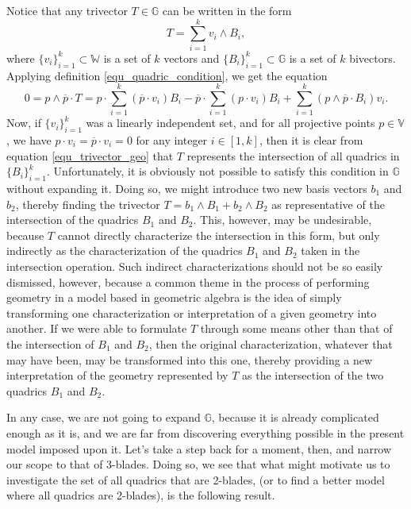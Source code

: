 \documentclass{birkjour}
\theoremstyle{definition}
\theoremstyle{remark}
\numberwithin{equation}{section}
\newcommand{\G}{\mathbb{G}}
\newcommand{\V}{\mathbb{V}}
\newcommand{\W}{\mathbb{W}}
\begin{document}
Notice that any trivector $T\in\G$ can be written in the form
\begin{equation}
T = \sum_{i=1}^k v_i\wedge B_i,
\end{equation}
where $\{v_i\}_{i=1}^k\subset\W$ is a set of $k$ vectors and $\{B_i\}_{i=1}^k\subset\G$
is a set of $k$ bivectors.  Applying definition \eqref{equ_quadric_condition}, we get the equation
\begin{equation}\label{equ_trivector_geo}
0 = p\wedge\overline{p}\cdot T =
p\cdot\sum_{i=1}^k(\overline{p}\cdot v_i)B_i -
\overline{p}\cdot\sum_{i=1}^k(p\cdot v_i)B_i +
\sum_{i=1}^k(p\wedge\overline{p}\cdot B_i)v_i.
\end{equation}
Now, if $\{v_i\}_{i=1}^k$ was a linearly independent set, and for all projective points $p\in\V$, we have $p\cdot v_i=\overline{p}\cdot v_i=0$
for any integer $i\in[1,k]$, then it is clear
from equation \eqref{equ_trivector_geo} that $T$ represents the intersection of all quadrics in $\{B_i\}_{i=1}^k$.
Unfortunately, it is obviously not possible to satisfy this condition in $\G$ without expanding it.
Doing so, we might introduce two new basis vectors $b_1$ and $b_2$, thereby finding the trivector
$T=b_1\wedge B_1+b_2\wedge B_2$ as representative of the intersection of the quadrics $B_1$ and $B_2$.
This, however, may be undesirable, because $T$ cannot directly characterize the intersection in this form, but
only indirectly as the characterization of the quadrics $B_1$ and $B_2$ taken in the intersection operation.
Such indirect characterizations should not be so easily dismissed, however, because a common theme
in the process of performing geometry in a model based in geometric algebra is the idea of simply transforming
one characterization or interpretation of a given geometry into another.  If we were able to formulate $T$ through some means
other than that of the intersection of $B_1$ and $B_2$, then the original characterization, whatever that may
have been, may be transformed into
this one, thereby providing a new interpretation of the geometry represented by $T$ as the intersection
of the two quadrics $B_1$ and $B_2$.

In any case, we are not going to expand $\G$, because it is already complicated enough as it is, and we
are far from discovering everything possible in the present model imposed upon it.
Let's take a step back for a moment, then, and narrow our scope to that of 3-blades.
Doing so, we see that
what might motivate us to investigate the set of all quadrics that are 2-blades, (or to find
a better model where all quadrics are 2-blades), is the following result.
\end{document}
